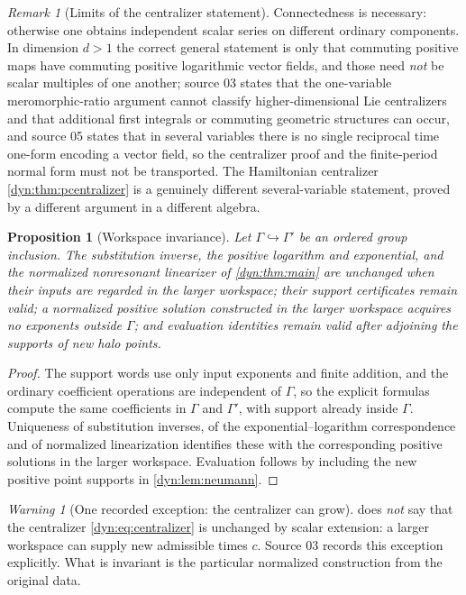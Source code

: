 \documentclass[11pt,letterpaper]{article}
\newtheorem{proposition}[proposition]{Proposition}
\theoremstyle{definition}
\theoremstyle{remark}
\newtheorem{remark}[remark]{Remark}
\newtheorem{warning}[warning]{Warning}
\numberwithin{equation}{section}
\begin{document}
\begin{remark}[Limits of the centralizer statement]
\label{dyn:rem:centralizer-limits}
Connectedness is necessary: otherwise one obtains independent scalar series
on different ordinary components. In dimension $d>1$ the correct general
statement is only that commuting positive maps have commuting positive
logarithmic vector fields, and those need \emph{not} be scalar multiples of
one another; source 03 states that the one-variable meromorphic-ratio
argument cannot classify higher-dimensional Lie centralizers and that
additional first integrals or commuting geometric structures can occur, and
source 05 states that in several variables there is no single reciprocal
time one-form encoding a vector field, so the centralizer proof and the
finite-period normal form must not be transported. The Hamiltonian
centralizer \cref{dyn:thm:pcentralizer} is a genuinely different
several-variable statement, proved by a different argument in a different
algebra.
\end{remark}

\begin{proposition}[Workspace invariance]\label{dyn:prop:workspace}
Let $\Gamma\hookrightarrow\Gamma'$ be an ordered group inclusion. The
substitution inverse, the positive logarithm and exponential, and the
normalized nonresonant linearizer of \cref{dyn:thm:main} are unchanged when
their inputs are regarded in the larger workspace; their support
certificates remain valid; a normalized positive solution constructed in
the larger workspace acquires no exponents outside $\Gamma$; and evaluation
identities remain valid after adjoining the supports of new halo points.
\end{proposition}
\begin{proof}
The support words use only input exponents and finite addition, and the
ordinary coefficient operations are independent of $\Gamma$, so the
explicit formulas compute the same coefficients in $\Gamma$ and $\Gamma'$,
with support already inside $\Gamma$. Uniqueness of substitution inverses,
of the exponential--logarithm correspondence and of normalized
linearization identifies these with the corresponding positive solutions in
the larger workspace. Evaluation follows by including the new positive
point supports in \cref{dyn:lem:neumann}.
\end{proof}

\begin{warning}[One recorded exception: the centralizer can grow]
\label{dyn:warn:workspace}
 does \emph{not} say that the centralizer
\eqref{dyn:eq:centralizer} is unchanged by scalar extension: a larger
workspace can supply new admissible times $c$. Source 03 records this
exception explicitly. What is invariant is the particular normalized
construction from the original data.
\end{warning}
\end{document}
